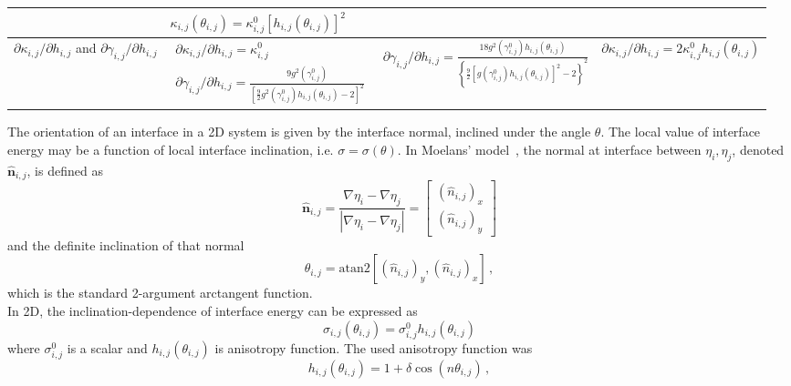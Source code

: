 \begin{table}
\begin{tabular}{p{2cm}|>{\centering\arraybackslash}p{5cm}>{\centering\arraybackslash}p{5cm}>{\centering\arraybackslash}p{4.2cm}}
				&
				$\kappa_{i,j}(\theta_{i,j})= \kappa_{i,j}^0[h_{i,j}(\theta_{i,j})]^2$ \\ \hline
				$\partial \kappa_{i,j}/\partial h_{i,j}$ and $\partial \gamma_{i,j}/\partial h_{i
					,j}$ 
				& $\begin{array}{l}
					\partial \kappa_{i,j}/\partial h_{i,j} = \kappa_{i,j}^0 \\
					\partial \gamma_{i,j}/\partial h_{i,j} = \frac{9g^2( \gamma_{i,j}^0)}{\left[\frac{9}{2}g^2(\gamma_{i,j}^0)h_{i,j}(\theta_{i,j}) - 2\right]^2}
				\end{array}$ 
				& $\partial \gamma_{i,j}/\partial h_{i,j} = \frac{18g^2(\gamma_{i,j}^0)h_{i,j}(\theta_{i,j})}{\left\{\frac{9}{2}[g(\gamma_{i,j}^0)h_{i,j}(\theta_{i,j})]^2 - 2\right\}^2}$ 
				& $\partial \kappa_{i,j}/\partial h_{i,j} = 2 \kappa_{i,j}^0h_{i,j}(\theta_{i,j})$\\
				\bottomrule
			\end{tabular}
		\end{table}
		The orientation of an interface in a 2D system is given by the interface normal, inclined under the angle $\theta$. The local value of interface energy may be a function of local interface inclination, i.e. $\sigma = \sigma(\theta)$. In Moelans' model~\cite{Moelans2008}, the normal at interface between $\eta_i,\eta_j$, denoted $\hat{\bm{n}}_{i,j}$, is defined as 
		\begin{equation} \label{eq_def_inclination}
			\hat{\bm{n}}_{i,j} = \frac{\nabla\eta_i-\nabla\eta_j}{|\nabla\eta_i-\nabla\eta_j|} = \left[\begin{array}{c}
				(\hat{n}_{i,j})_x   \\
				(\hat{n}_{i,j})_y
			\end{array} \right]
		\end{equation}
		and the definite inclination of that normal 
		\begin{equation}
			\theta_{i,j} = \mathrm{atan2}[(\hat{n}_{i,j})_y,(\hat{n}_{i,j})_x] \,,
		\end{equation}
		which is the standard 2-argument arctangent function.\\
		In 2D, the inclination-dependence of interface energy can be expressed as 
		\begin{equation}\label{eq_IE_incldep}
			\sigma_{i,j}(\theta_{i,j}) = \sigma_{i,j}^0h_{i,j}(\theta_{i,j})
		\end{equation}
		where $\sigma_{i,j}^0$ is a scalar and  $h_{i,j}(\theta_{i,j})$ is anisotropy function. The used anisotropy function was
		\begin{equation}
			h_{i,j}(\theta_{i,j}) = 1 + \delta\cos(n\theta_{i,j}) \,,
		\end{equation}
		
